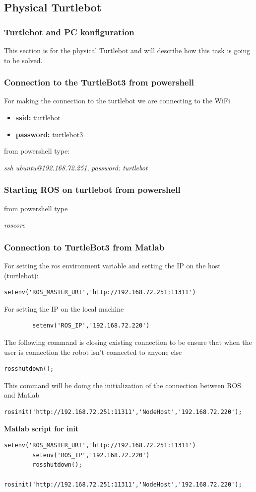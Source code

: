 \documentclass[12pt,a4paper]{article}
\begin{document}
	\subsection{Physical Turtlebot}
	\subsubsection{Turtlebot and PC konfiguration}
	This section is for the physical Turtlebot and will describe how this task is going to be solved.
	\subsubsection{Connection to the TurtleBot3 from powershell}
	For making the connection to the turtlebot we are connecting to the WiFi 
	\begin{itemize}
		\item \textbf{ssid:} turtlebot
		\item \textbf{password:} turtlebot3
	\end{itemize}
	from powershell type:
	\begin{center}
		\textit{ssh ubuntu@192.168.72.251}, \textit{password: turtlebot}
	\end{center}
	\subsubsection{Starting ROS on turtlebot from powershell}
	from powershell type
	\begin{center}
		\textit{roscore}
	\end{center}
	\subsubsection{Connection to TurtleBot3 from Matlab}
	For setting the ros environment variable and setting the IP on the host (turtlebot):
	\begin{lstlisting}[style=Matlab-editor]
		setenv('ROS_MASTER_URI','http://192.168.72.251:11311')\end{lstlisting}
	For setting the IP on the local machine 
	\begin{lstlisting}
		setenv('ROS_IP','192.168.72.220')\end{lstlisting}
	The following command is closing existing connection to be ensure that when the user is connection the robot isn't connected to anyone else
	\begin{lstlisting}[style=Matlab-editor]
		rosshutdown();\end{lstlisting}
	This command will be doing the initialization of the connection between ROS and Matlab
	\begin{lstlisting}[style=Matlab-editor]
		rosinit('http://192.168.72.251:11311','NodeHost','192.168.72.220');\end{lstlisting} 
	\vspace{1cm}
	\noindent\textbf{Matlab script for init}
	\begin{lstlisting}[style=Matlab-editor]
		setenv('ROS_MASTER_URI','http://192.168.72.251:11311')
		setenv('ROS_IP','192.168.72.220')
		rosshutdown();
		rosinit('http://192.168.72.251:11311','NodeHost','192.168.72.220');\end{lstlisting}
\end{document}
